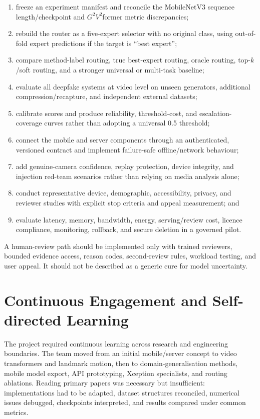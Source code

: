 \begin{enumerate}
  \item freeze an experiment manifest and reconcile the MobileNetV3 sequence
        length/checkpoint and $G^2V^2$former metric discrepancies;
  \item rebuild the router as a five-expert selector with no original class,
        using out-of-fold expert predictions if the target is ``best expert'';
  \item compare method-label routing, true best-expert routing, oracle routing,
        top-$k$/soft routing, and a stronger universal or multi-task baseline;
  \item evaluate all deepfake systems at video level on unseen generators,
        additional compression/recapture, and independent external datasets;
  \item calibrate scores and produce reliability, threshold-cost, and escalation-
        coverage curves rather than adopting a universal 0.5 threshold;
  \item connect the mobile and server components through an authenticated,
        versioned contract and implement failure-safe offline/network behaviour;
  \item add genuine-camera confidence, replay protection, device integrity, and
        injection red-team scenarios rather than relying on media analysis alone;
  \item conduct representative device, demographic, accessibility, privacy, and
        reviewer studies with explicit stop criteria and appeal measurement; and
  \item evaluate latency, memory, bandwidth, energy, serving/review cost, licence
        compliance, monitoring, rollback, and secure deletion in a governed pilot.
\end{enumerate}

A human-review path should be implemented only with trained reviewers, bounded
evidence access, reason codes, second-review rules, workload testing, and user
appeal. It should not be described as a generic cure for model uncertainty.

\section{Continuous Engagement and Self-directed Learning}

The project required continuous learning across research and engineering
boundaries. The team moved from an initial mobile/server concept to video
transformers and landmark motion, then to domain-generalisation methods, mobile
model export, API prototyping, Xception specialists, and routing ablations. Reading
primary papers was necessary but insufficient: implementations had to be adapted,
dataset structures reconciled, numerical issues debugged, checkpoints interpreted,
and results compared under common metrics.

